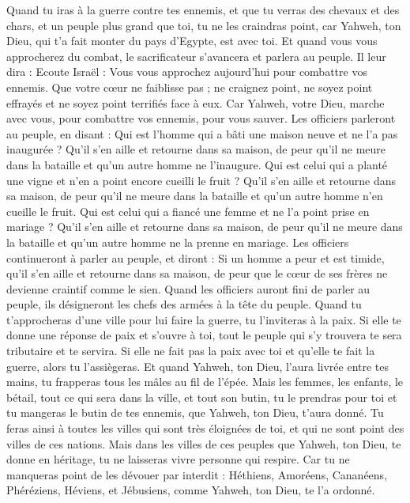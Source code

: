 \begin{multicols}{2}
\VerseOne{}Quand tu iras à la guerre contre tes ennemis, et que tu verras des chevaux et des chars, et un peuple plus grand que toi, tu ne les craindras point, car Yahweh, ton Dieu, qui t'a fait monter du pays d'Egypte, est avec toi.
Et quand vous vous approcherez du combat, le sacrificateur s'avancera et parlera au peuple.
Il leur dira : Ecoute Israël : Vous vous approchez aujourd'hui pour combattre vos ennemis. Que votre cœur ne faiblisse pas ; ne craignez point, ne soyez point effrayés et ne soyez point terrifiés face à eux.
Car Yahweh, votre Dieu, marche avec vous, pour combattre vos ennemis, pour vous sauver.
Les officiers parleront au peuple, en disant : Qui est l’homme qui a bâti une maison neuve et ne l'a pas inaugurée ? Qu'il s'en aille et retourne dans sa maison, de peur qu'il ne meure dans la bataille et qu'un autre homme ne l’inaugure.
Qui est celui qui a planté une vigne et n'en a point encore cueilli le fruit ? Qu’il s'en aille et retourne dans sa maison, de peur qu'il ne meure dans la bataille et qu'un autre homme n’en cueille le fruit.
Qui est celui qui a fiancé une femme et ne l'a point prise en mariage ? Qu’il s'en aille et retourne dans sa maison, de peur qu'il ne meure dans la bataille et qu'un autre homme ne la prenne en mariage.
Les officiers continueront à parler au peuple, et diront : Si un homme a peur et est timide, qu'il s'en aille et retourne dans sa maison, de peur que le cœur de ses frères ne devienne craintif comme le sien.
Quand les officiers auront fini de parler au peuple, ils désigneront les chefs des armées à la tête du peuple.
Quand tu t'approcheras d'une ville pour lui faire la guerre, tu l’inviteras à la paix.
Si elle te donne une réponse de paix et s’ouvre à toi, tout le peuple qui s’y trouvera te sera tributaire et te servira.
Si elle ne fait pas la paix avec toi et qu'elle te fait la guerre, alors tu l’assiègeras.
Et quand Yahweh, ton Dieu, l'aura livrée entre tes mains, tu frapperas tous les mâles au fil de l’épée.
Mais les femmes, les enfants, le bétail, tout ce qui sera dans la ville, et tout son butin, tu le prendras pour toi et tu mangeras le butin de tes ennemis, que Yahweh, ton Dieu, t'aura donné.
Tu feras ainsi à toutes les villes qui sont très éloignées de toi, et qui ne sont point des villes de ces nations.
Mais dans les villes de ces peuples que Yahweh, ton Dieu, te donne en héritage, tu ne laisseras vivre personne qui respire.
Car tu ne manqueras point de les dévouer par interdit : Héthiens, Amoréens, Cananéens, Phéréziens, Héviens, et Jébusiens, comme Yahweh, ton Dieu, te l'a ordonné.

\end{multicols}

